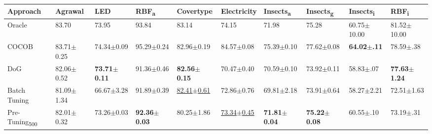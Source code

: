 \documentclass{article} %
\begin{document}
\begin{center}
   \begin{sideways}
      \begin{minipage}{0.9\textheight}
         \centering
         \small
         \begin{tabular}{llllllllll}
            \toprule
            Approach                       & Agrawal                  & LED                      & RBF\textsubscript{a}     & Covertype                  & Electricity                & Insects\textsubscript{a} & Insects\textsubscript{g}   & Insects\textsubscript{i} & RBF\textsubscript{i}     \\ \midrule
            Oracle                         & 83.70                    & 73.95                    & 93.84                    & 83.14                      & 74.15                      & 71.98                    & 75.28                      & 60.75$\pm$10.00          & 81.52$\pm$10.00          \\
            COCOB                          & 83.71$\pm$0.25           & 74.34$\pm$0.09           & 95.29$\pm$0.24           & 82.96$\pm$0.19             & 84.57$\pm$0.08             & 75.39$\pm$0.10           & 77.62$\pm$0.08             & \bfseries 64.02$\pm$.11  & 78.59$\pm$.38            \\ \midrule
            DoG                            & 82.06$\pm$0.52           & \bfseries 73.71$\pm$0.11 & 91.36$\pm$0.46           & \bfseries 82.56$\pm$0.15   & 70.47$\pm$0.40             & 70.59$\pm$0.10           & 73.92$\pm$0.11             & 58.83$\pm$.07            & \bfseries 77.63$\pm$1.24 \\
            Batch Tuning                   & 81.09$\pm$1.34           & 66.67$\pm$3.28           & 91.89$\pm$0.39           & \underline{82.41$\pm$0.61} & 72.86$\pm$0.76             & 69.81$\pm$2.18           & 73.91$\pm$0.64             & 58.27$\pm$2.21           & 72.51$\pm$1.63           \\
            Pre-Tuning\textsubscript{500}  & 82.01$\pm$0.32           & 73.26$\pm$0.03           & \bfseries 92.36$\pm$0.03 & 80.25$\pm$1.86             & \underline{73.34$\pm$0.45} & \bfseries 71.81$\pm$0.04 & \bfseries 75.22$\pm$0.08   & 60.55$\pm$.10            & 73.19$\pm$.31            \\

\end{tabular}
\end{minipage}
\end{sideways}
\end{center}
\end{document}
